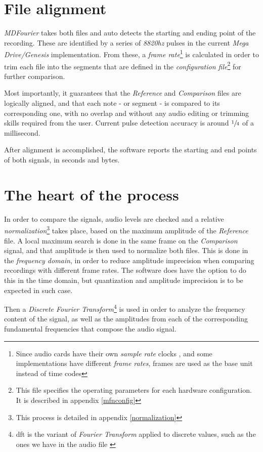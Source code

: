 \documentclass[10pt,a4paper]{report}
\begin{document}
\section{File alignment}

\textit{MDFourier} takes both files and auto detects the starting and ending point of the recording. These are identified by a series of \textit{8820hz} pulses in the current \textit{Mega Drive/Genesis} implementation. From these, a \textit{frame rate}\footnote{Since audio cards have their own \textit{sample rate} clocks \cite{SoundCardClock} \cite{soundcardtiming} \cite{gwsoundcardtiming}, and some implementations have different \textit{frame rates}, frames are used as the base unit instead of time codes} is calculated in order to trim each file into the segments that are defined in the \textit{configuration file}\footnote{This file specifies the operating parameters for each hardware configuration. It is described in appendix \ref{mfnconfig}} for further comparison.

Most importantly, it guarantees that the \textit{Reference} and \textit{Comparison} files are logically aligned, and that each note - or segment - is compared to its corresponding one, with no overlap and without any audio editing or trimming skills required from the user. Current pulse detection accuracy is around $\sfrac{1}{4}$ of a millisecond.

After alignment is accomplished, the software reports the starting and end points of both signals, in seconds and bytes.

\section{The heart of the process}

In order to compare the signals, audio levels are checked and a relative \textit{normalization}\footnote{This process is detailed in appendix \ref{normalization}} takes place, based on the maximum amplitude of the \textit{Reference} file. A local maximum search is done in the same frame on the \textit{Comparison} signal, and that amplitude is then used to normalize both files. This is done in the \textit{frequency domain}, in order to reduce amplitude imprecision when comparing recordings with different frame rates. The software does have the option to do this in the time domain, but quantization and amplitude imprecision is to be expected in such case.

Then a \textit{Discrete Fourier Transform}\footnote{\gls{dft} is the variant of \textit{Fourier Transform} applied to discrete values, such as the ones we have in the audio file \cite{FourierTransformApps}} is used in order to analyze the frequency content of the signal, as well as the amplitudes from each of the corresponding fundamental frequencies that compose the audio signal.
\end{document}
